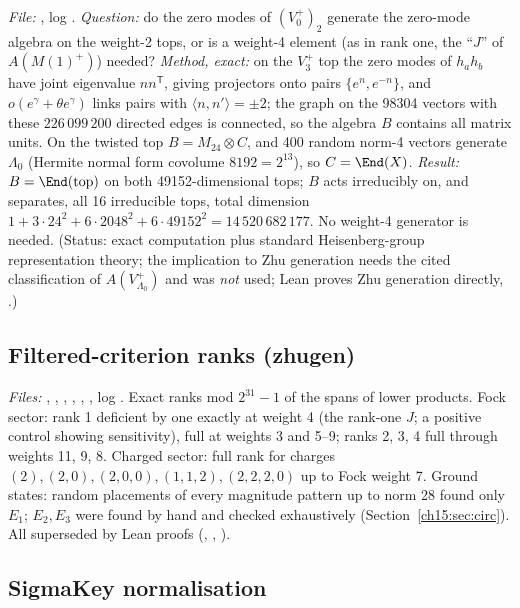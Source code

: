\emph{File:} , log . \emph{Question:} do the zero modes of
$(V_0^+)_2$ generate the zero-mode algebra on the weight-2 tops, or is a weight-4 element (as in
rank one, the ``$J$'' of $A(M(1)^+)$) needed? \emph{Method, exact:} on the $V_3^+$ top the zero
modes of $h_ah_b$ have joint eigenvalue $nn^{\mathsf T}$, giving projectors onto pairs
$\{e^n,e^{-n}\}$, and $o(e^\gamma+\theta e^\gamma)$ links pairs with $\langle n,n'\rangle=\pm2$; the graph on the
98304 vectors with these $226\,099\,200$ directed edges is connected, so the algebra $B$ contains
all matrix units. On the twisted top $B=M_{24}\otimes C$, and 400 random norm-4 vectors generate
$\Lambda_0$ (Hermite normal form covolume $8192=2^{13}$), so $C=\End(X)$. \emph{Result:} $B=\End(\mathrm{top})$
on both 49152-dimensional tops; $B$ acts irreducibly on, and separates, all 16 irreducible tops, total
dimension $1+3\cdot24^2+6\cdot2048^2+6\cdot49152^2=14\,520\,682\,177$. No weight-4 generator is
needed. (Status: exact computation plus standard Heisenberg-group representation theory; the
implication to Zhu generation needs the cited classification of $A(V_{\Lambda_0}^+)$ and was
\emph{not} used; Lean proves Zhu generation directly, .)

\subsection{Filtered-criterion ranks (zhugen)}

\emph{Files:} , , ,
, , , log . Exact ranks
mod $2^{31}-1$ of the spans of lower products. Fock sector: rank 1 deficient by one exactly at
weight 4 (the rank-one $J$; a positive control showing sensitivity), full at weights 3 and 5--9;
ranks 2, 3, 4 full through weights 11, 9, 8. Charged sector: full rank for charges
$(2),(2,0),(2,0,0),(1,1,2),(2,2,2,0)$ up to Fock weight 7. Ground states: random placements of every
magnitude pattern up to norm 28 found only $E_1$; $E_2,E_3$ were found by hand and checked
exhaustively (Section~\ref{ch15:sec:circ}). All superseded by Lean proofs (,
, ).

\subsection{SigmaKey normalisation}\label{ch15:sec:num-sigmakey}

